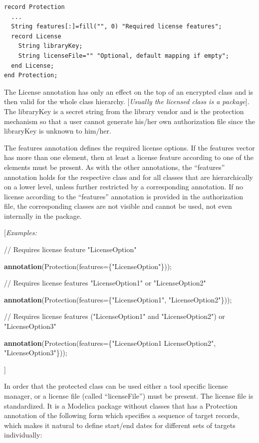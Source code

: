\documentclass[10pt,a4paper]{report}
\begin{document}
\begin{lstlisting}[language=modelica]
record Protection
  ...
  String features[:]=fill("", 0) "Required license features";
  record License
    String libraryKey;
    String licenseFile="" "Optional, default mapping if empty";
  end License;
end Protection;
\end{lstlisting}
The License annotation has only an effect on the top of an encrypted
class and is then valid for the whole class hierarchy. {[}\emph{Usually
the licensed class is a package}{]}. The libraryKey is a secret string
from the library vendor and is the protection mechanism so that a user
cannot generate his/her own authorization file since the libraryKey is
unknown to him/her.

The features annotation defines the required license options. If the
features vector has more than one element, then at least a license
feature according to one of the elements must be present. As with the
other annotations, the ``features'' annotation holds for the respective
class and for all classes that are hierarchically on a lower level,
unless further restricted by a corresponding annotation. If no license
according to the ``features'' annotation is provided in the
authorization file, the corresponding classes are not visible and cannot
be used, not even internally in the package.

{[}\emph{Examples:}

// Requires license feature "LicenseOption"

\textbf{annotation}(Protection(features=\{"LicenseOption"\}));

// Requires license features "LicenseOption1" or "LicenseOption2"

\textbf{annotation}(Protection(features=\{"LicenseOption1",
"LicenseOption2"\}));

// Requires license features ("LicenseOption1" and "LicenseOption2") or
"LicenseOption3"

\textbf{annotation}(Protection(features=\{"LicenseOption1
LicenseOption2", "LicenseOption3"\}));

{]}

In order that the protected class can be used either a tool specific
license manager, or a license file (called ``licenseFile'') must be
present. The license file is standardized. It is a Modelica package
without classes that has a Protection annotation of the following form
which specifies a sequence of target records, which makes it natural to
define start/end dates for different sets of targets individually:
\end{document}
